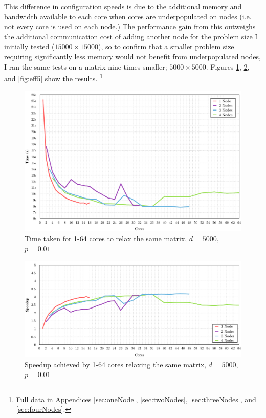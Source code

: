 \documentclass[12pt]{article}
\begin{document}
This difference in configuration speeds is due to the additional memory and bandwidth available to each core when cores are underpopulated on nodes (i.e. not every core is used on each node.) The performance gain from this outweighs the additional communication cost of adding another node for the problem size I initially tested ($15000\times{}15000$), so to confirm that a smaller problem size requiring significantly less memory would not benefit from underpopulated nodes, I ran the same tests on a matrix nine times smaller; $5000\times{}5000$. Figures \ref{fig:time5}, \ref{fig:sp5}, and \ref{fig:eff5} show the results. \footnote{Full data in Appendices \ref{sec:oneNode}, \ref{sec:twoNodes}, \ref{sec:threeNodes}, and  \ref{sec:fourNodes}.}

\begin{figure}[htbp!]
        \centering\includegraphics[width=\textwidth]{img/5ktime.pdf}
        \caption{Time taken for 1-64 cores to relax the same matrix, $d=5000$, $p=0.01$}
        \label{fig:time5}
\end{figure}
\begin{figure}[htbp!]
        \centering\includegraphics[width=\textwidth]{img/5kspeedup.pdf}
        \caption{Speedup achieved by 1-64 cores relaxing the same matrix, $d=5000$, $p=0.01$}
        \label{fig:sp5}
\end{figure}
\end{document}
